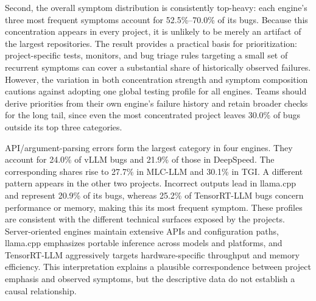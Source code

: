 Second, the overall symptom distribution is consistently top-heavy: each engine's three most frequent symptoms account for 52.5\%--70.0\% of its bugs. Because this concentration appears in every project, it is unlikely to be merely an artifact of the largest repositories. The result provides a practical basis for prioritization: project-specific tests, monitors, and bug triage rules targeting a small set of recurrent symptoms can cover a substantial share of historically observed failures. However, the variation in both concentration strength and symptom composition cautions against adopting one global testing profile for all engines. Teams should derive priorities from their own engine's failure history and retain broader checks for the long tail, since even the most concentrated project leaves 30.0\% of bugs outside its top three categories.


API/argument-parsing errors form the largest category in four engines. They account for 24.0\% of vLLM bugs and 21.9\% of those in DeepSpeed. The corresponding shares rise to 27.7\% in MLC-LLM and 30.1\% in TGI. A different pattern appears in the other two projects. Incorrect outputs lead in llama.cpp and represent 20.9\% of its bugs, whereas 25.2\% of TensorRT-LLM bugs concern performance or memory, making this its most frequent symptom. These profiles are consistent with the different technical surfaces exposed by the projects. Server-oriented engines maintain extensive APIs and configuration paths, llama.cpp emphasizes portable inference across models and platforms, and TensorRT-LLM aggressively targets hardware-specific throughput and memory efficiency. This interpretation explains a plausible correspondence between project emphasis and observed symptoms, but the descriptive data do not establish a causal relationship.

